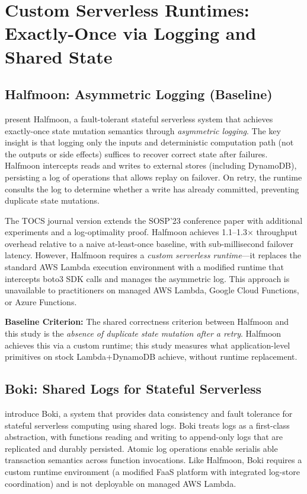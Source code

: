\section{Custom Serverless Runtimes: Exactly-Once via Logging and Shared State}

\subsection{Halfmoon: Asymmetric Logging (Baseline)}

\citet{Qi2025Halfmoon} present Halfmoon, a fault-tolerant stateful serverless system that achieves exactly-once state mutation semantics through \textit{asymmetric logging}. The key insight is that logging only the inputs and deterministic computation path (not the outputs or side effects) suffices to recover correct state after failures. Halfmoon intercepts reads and writes to external stores (including DynamoDB), persisting a log of operations that allows replay on failover. On retry, the runtime consults the log to determine whether a write has already committed, preventing duplicate state mutations.

The TOCS journal version \citep{Qi2025Halfmoon} extends the SOSP'23 conference paper \citep{Qi2023HalfmoonSOSP} with additional experiments and a log-optimality proof. Halfmoon achieves 1.1--1.3$\times$ throughput overhead relative to a naive at-least-once baseline, with sub-millisecond failover latency. However, Halfmoon requires a \textit{custom serverless runtime}---it replaces the standard AWS Lambda execution environment with a modified runtime that intercepts boto3 SDK calls and manages the asymmetric log. This approach is unavailable to practitioners on managed AWS Lambda, Google Cloud Functions, or Azure Functions.

\textbf{Baseline Criterion:} The shared correctness criterion between Halfmoon and this study is the \textit{absence of duplicate state mutation after a retry}. Halfmoon achieves this via a custom runtime; this study measures what application-level primitives on stock Lambda+DynamoDB achieve, without runtime replacement.

\subsection{Boki: Shared Logs for Stateful Serverless}

\citet{Jia2024Boki} introduce Boki, a system that provides data consistency and fault tolerance for stateful serverless computing using shared logs. Boki treats logs as a first-class abstraction, with functions reading and writing to append-only logs that are replicated and durably persisted. Atomic log operations enable serialis able transaction semantics across function invocations. Like Halfmoon, Boki requires a custom runtime environment (a modified FaaS platform with integrated log-store coordination) and is not deployable on managed AWS Lambda.

